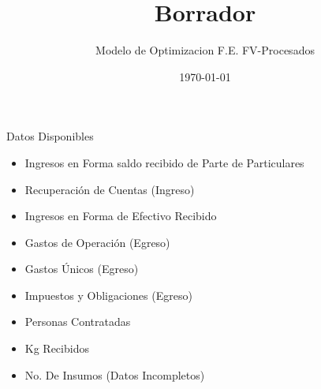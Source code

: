 \documentclass{beamer} %
\title{Borrador}
\subtitle{Modelo de Optimizacion F.E. FV-Procesados}
\date{\today}
\begin{document}

    \begin{frame}
        \titlepage
    \end{frame}

    \begin{frame}{Datos Disponibles}
        \begin{tcolorbox}
            \begin{itemize}

                \item [\color{teal}\checkmark]Ingresos en Forma saldo recibido de Parte de Particulares
                \item [\color{teal}\checkmark]Recuperación de Cuentas (Ingreso)
                \item [\color{teal}\textbf{?}]Ingresos en Forma de Efectivo Recibido
                \item [\color{teal}\checkmark]Gastos de Operación (Egreso)
                \item [\color{teal}\checkmark]Gastos Únicos (Egreso)
                \item [\color{teal}\checkmark]Impuestos y Obligaciones (Egreso)
                \item [\color{red}$\mathbf{\oslash}$]Personas Contratadas
                \item [\color{red}$\mathbf{\oslash}$]Kg Recibidos
                \item [\color{orange}\textbf{?}]No. De Insumos (Datos Incompletos)
            \end{itemize}
        \end{tcolorbox}
    \end{frame}
\end{document}
